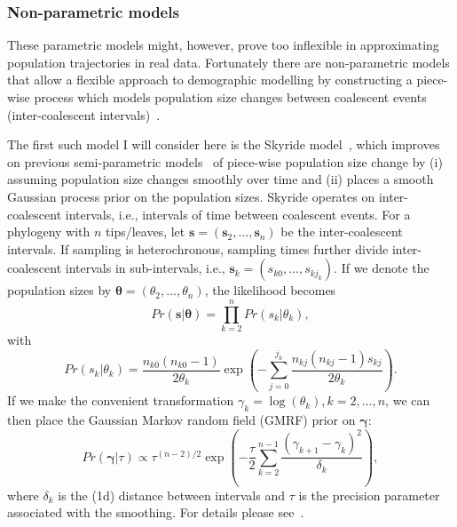 \subsubsection{Non-parametric models}

These parametric models might, however, prove too inflexible in approximating population trajectories in real data.
Fortunately there are non-parametric models that allow a flexible approach to demographic modelling by constructing a piece-wise process which models population size changes between coalescent events (inter-coalescent intervals)~\citep{Pybus2000,Minin2008,Gill2012}.

The first such model I will consider here is the Skyride model~\citep{Minin2008}, which improves on previous semi-parametric models~\citep{Pybus2000} of piece-wise population size change by (i) assuming population size changes smoothly over time and (ii) places a smooth Gaussian process prior on the population sizes.
Skyride operates on inter-coalescent intervals, i.e., intervals of time between coalescent events.
For a phylogeny with $n$ tips/leaves, let $\boldsymbol s = ( \boldsymbol s_2, \ldots, \boldsymbol s_n )$ be the inter-coalescent intervals.
If sampling is heterochronous, sampling times further divide inter-coalescent intervals in sub-intervals, i.e., $\boldsymbol s_k = (s_{k0}, \ldots, s_{kj_{k}} ) $.
If we denote the population sizes by $\boldsymbol \theta = ( \theta_2, \ldots, \theta_n )$, the likelihood becomes 
$$ Pr(\boldsymbol s | \boldsymbol \theta) = \prod_{k = 2}^n Pr(s_k | \theta_k), $$
with
$$ Pr(s_k | \theta_k) = \frac{n_{k0} (n_{k0} - 1)}{2\theta_k} \exp\left( - \sum_{j=0}^{j_{k}} \frac{ n_{kj} (n_{kj} - 1)s_{kj} }{2\theta_k}\right). $$
If we make the convenient transformation $\gamma_k = \log(\theta_k), k = 2, \ldots, n $, we can then place the Gaussian Markov random field (GMRF) prior on $\boldsymbol \gamma $:
$$ Pr(\boldsymbol \gamma | \tau ) \propto \tau^{(n-2)/2} \exp\left(- \frac{\tau}{2} \sum_{k = 2}^{n-1} \frac{(\gamma_{k + 1} -\gamma_k)^2}{\delta_k} \right), $$
where $\delta_k$ is the (1d) distance between intervals and $\tau$ is the precision parameter associated with the smoothing.
For details please see~\cite{Minin2008}.


